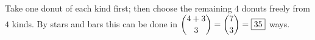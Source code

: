 Take one donut of each kind first; then choose the remaining $4$ donuts freely from $4$ kinds. By stars and bars this can be done in $\dbinom{4+3}{3}=\dbinom73=\boxed{35}$ ways.
